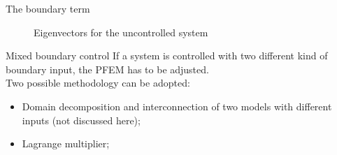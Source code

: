\documentclass[aspectratio=169]{ISAE-Beamer}
\begin{document}
\begin{frame}[t]{The boundary term}
{\begin{figure}
\caption{Eigenvectors for the uncontrolled system}
\end{figure}
}
\end{frame}

\begin{frame}{Mixed boundary control}
If a system is controlled with two different kind of boundary input, the PFEM has to be adjusted. \\
\vspace{1cm}
Two possible methodology can be adopted:
\begin{itemize}
\item Domain decomposition and interconnection of two models with different inputs (not discussed here); \\
\item Lagrange multiplier; 
\end{itemize}

\end{frame}
\end{document}
